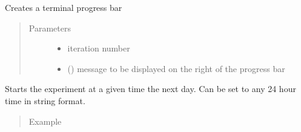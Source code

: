 \documentclass[letterpaper,10pt,english]{sphinxmanual}
\begin{document}
\begin{fulllineitems}
\begin{fulllineitems}
\begin{quote}
\begin{description}
\end{description}\end{quote}

\end{fulllineitems}


\begin{fulllineitems}
\label{\detokenize{laboratory:laboratory.Setup._progress_bar}}
Creates a terminal progress bar
\begin{quote}\begin{description}
\item[{Parameters}] \leavevmode\begin{itemize}
\item {} 
 \textendash{} iteration number

\item {} 
 () \textendash{} message to be displayed on the right of the progress bar

\end{itemize}

\end{description}\end{quote}

\end{fulllineitems}


\begin{fulllineitems}
\label{\detokenize{laboratory:laboratory.Setup.delayed_start}}
Starts the experiment at a given time the next day. Can be set to any 24 hour time in string format.
\begin{quote}\begin{description}
\item[{Example}] \leavevmode
\end{description}\end{quote}


\end{fulllineitems}
\end{fulllineitems}
\end{document}
